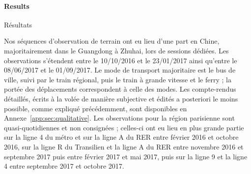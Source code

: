 \paragraph{Results}{Résultats}

Nos séquences d'observation de terrain ont eu lieu d'une part en Chine, majoritairement dans le Guangdong à Zhuhai, lors de sessions dédiées. Les observations s'étendent entre le 10/10/2016 et le 23/01/2017 ainsi qu'entre le 08/06/2017 et le 01/09/2017. Le mode de transport majoritaire est le bus de ville, suivi par le train régional, puis le train à grande vitesse et le ferry ; la portée des déplacements correspondent à celle des modes. Les compte-rendus détaillés, écrits à la volée de manière subjective et édités a posteriori le moins possible, comme expliqué précédemment, sont disponibles en Annexe~\ref{app:sec:qualitative}. Les observations pour la région parisienne sont quasi-quotidiennes et non consignées ; celles-ci ont eu lieu en plus grande partie sur la ligne 4 du métro et sur la ligne A du RER entre février 2016 et octobre 2016, sur la ligne R du Transilien et la ligne A du RER entre novembre 2016 et septembre 2017 puis entre février 2017 et mai 2017, puis sur la ligne 9 et la ligne 4 entre septembre 2017 et octobre 2017.




